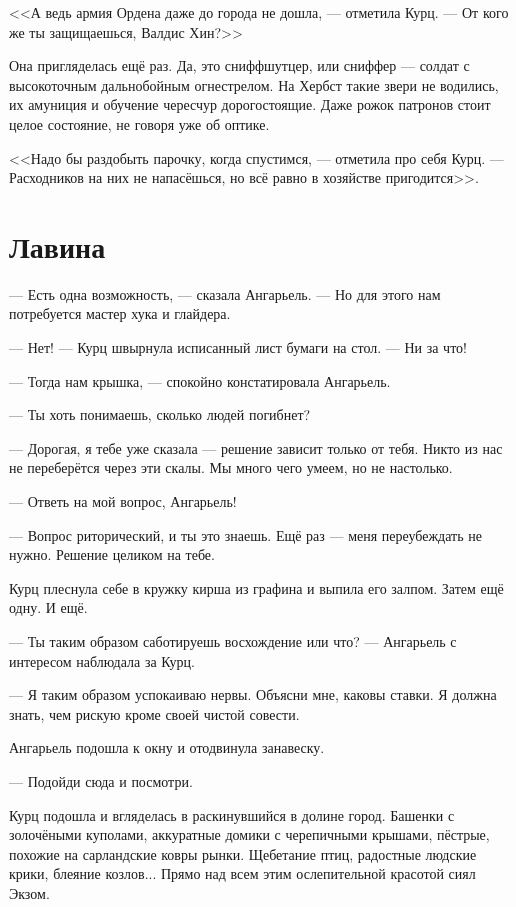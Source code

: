 <<А ведь армия Ордена даже до города не дошла, --- отметила Курц.
--- От кого же ты защищаешься, Валдис Хин?>>

Она пригляделась ещё раз.
Да, это сниффшутцер, или сниффер --- солдат с высокоточным дальнобойным огнестрелом.
На Хербст такие звери не водились, их амуниция и обучение чересчур дорогостоящие.
Даже рожок патронов стоит целое состояние, не говоря уже об оптике.

<<Надо бы раздобыть парочку, когда спустимся, --- отметила про себя Курц.
--- Расходников на них не напасёшься, но всё равно в хозяйстве пригодится>>.

\section{Лавина}

--- Есть одна возможность, --- сказала Ангарьель.
--- Но для этого нам потребуется мастер хука и глайдера.

\asterism

--- Нет! --- Курц швырнула исписанный лист бумаги на стол.
--- Ни за что!

--- Тогда нам крышка, --- спокойно констатировала Ангарьель.

--- Ты хоть понимаешь, сколько людей погибнет?

--- Дорогая, я тебе уже сказала --- решение зависит только от тебя.
Никто из нас не переберётся через эти скалы.
Мы много чего умеем, но не настолько.

--- Ответь на мой вопрос, Ангарьель!

--- Вопрос риторический, и ты это знаешь.
Ещё раз --- меня переубеждать не нужно.
Решение целиком на тебе.

Курц плеснула себе в кружку кирша из графина и выпила его залпом.
Затем ещё одну.
И ещё.

--- Ты таким образом саботируешь восхождение или что? --- Ангарьель с интересом наблюдала за Курц.

--- Я таким образом успокаиваю нервы.
Объясни мне, каковы ставки.
Я должна знать, чем рискую кроме своей чистой совести.

Ангарьель подошла к окну и отодвинула занавеску.

--- Подойди сюда и посмотри.

Курц подошла и вгляделась в раскинувшийся в долине город.
Башенки с золочёными куполами, аккуратные домики с черепичными крышами, пёстрые, похожие на сарландские ковры рынки.
Щебетание птиц, радостные людские крики, блеяние козлов...
Прямо над всем этим ослепительной красотой сиял Экзом.

